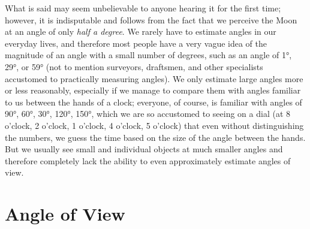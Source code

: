 What is said may seem unbelievable to anyone hearing it for the first time; however, it is indisputable and follows from the fact that we perceive the Moon at an angle of only \emph{half a degree}. We rarely have to estimate angles in our everyday lives, and therefore most people have a very vague idea of the magnitude of an angle with a small number of degrees, such as an angle of \ang{1}, \ang{29}, or \ang{59} (not to mention surveyors, draftsmen, and other specialists accustomed to practically measuring angles). We only estimate large angles more or less reasonably, especially if we manage to compare them with angles familiar to us between the hands of a clock; everyone, of course, is familiar with angles of \ang{90}, \ang{60}, \ang{30}, \ang{120}, \ang{150}, which we are so accustomed to seeing on a dial (at 8 o'clock, 2 o'clock, 1 o'clock, 4 o'clock, 5 o'clock) that even without distinguishing the numbers, we guess the time based on the size of the angle between the hands. But we usually see small and individual objects at much smaller angles and therefore completely lack the ability to even approximately estimate angles of view.


\section{Angle of View}
\label{sec-3.2}

